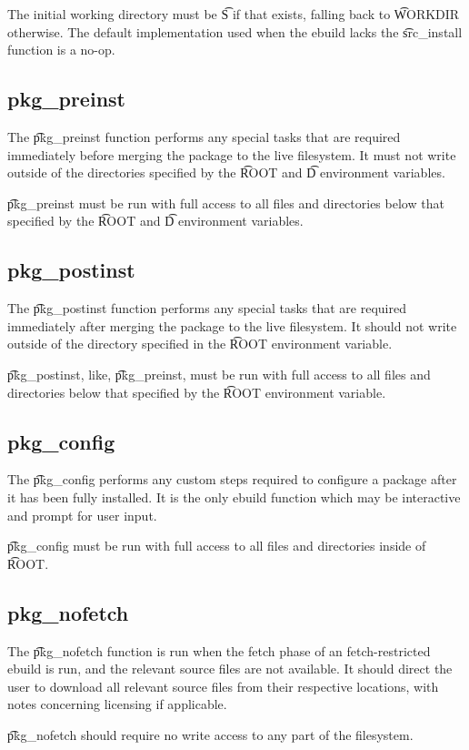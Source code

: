The initial working directory must be \t{S} if that exists, falling back to \t{WORKDIR} otherwise.
The default implementation used when the ebuild lacks the \t{src\_install} function is a no-op.

\subsection{pkg\_preinst}
\label{pkg-preinst-function}

The \t{pkg\_preinst} function performs any special tasks that are required immediately before
merging the package to the live filesystem. It must not write outside of the directories specified
by the \t{ROOT} and \t{D} environment variables.

\t{pkg\_preinst} must be run with full access to all files and directories below that specified by
the \t{ROOT} and \t{D} environment variables.

\subsection{pkg\_postinst}
\label{pkg-postinst-function}

The \t{pkg\_postinst} function performs any special tasks that are required immediately after
merging the package to the live filesystem. It should not write outside of the directory specified
in the \t{ROOT} environment variable.

\t{pkg\_postinst}, like, \t{pkg\_preinst}, must be run with full access to all files and directories
below that specified by the \t{ROOT} environment variable.

\subsection{pkg\_config}
\label{pkg-config-function}

The \t{pkg\_config} performs any custom steps required to configure a package after it has been
fully installed. It is the only ebuild function which may be interactive and prompt for user input.

\t{pkg\_config} must be run with full access to all files and directories inside of \t{ROOT}.

\subsection{pkg\_nofetch}
\label{pkg-nofetch-function}

The \t{pkg\_nofetch} function is run when the fetch phase of an fetch-restricted ebuild is run, and
the relevant source files are not available. It should direct the user to download all relevant
source files from their respective locations, with notes concerning licensing if applicable.

\t{pkg\_nofetch} should require no write access to any part of the filesystem.


